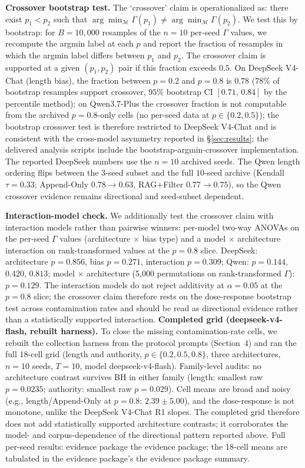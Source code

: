\documentclass[11pt]{article}
\begin{document}
\noindent\textbf{Crossover bootstrap test.} The `crossover' claim is operationalized as: there exist $p_1 < p_2$ such that $\arg\min_{\mathcal{M}} \Gamma(p_1) \neq \arg\min_{\mathcal{M}} \Gamma(p_2)$. We test this by bootstrap: for $B = 10{,}000$ resamples of the $n=10$ per-seed $\Gamma$ values, we recompute the argmin label at each $p$ and report the fraction of resamples in which the argmin label differs between $p_1$ and $p_2$. The crossover claim is supported at a given $(p_1, p_2)$ pair if this fraction exceeds $0.5$. On DeepSeek V4-Chat (length bias), the fraction between $p=0.2$ and $p=0.8$ is $0.78$ ($78\%$ of bootstrap resamples support crossover, $95\%$ bootstrap CI $[0.71,\,0.84]$ by the percentile method); on Qwen3.7-Plus the crossover fraction is not computable from the archived $p{=}0.8$-only cells (no per-seed data at $p \in \{0.2, 0.5\}$); the bootstrap crossover test is therefore restricted to DeepSeek V4-Chat and is consistent with the cross-model asymmetry reported in \S\ref{sec:results}; the delivered analysis scripts include the bootstrap-argmin-crossover implementation. The reported DeepSeek numbers use the $n{=}10$ archived seeds. The Qwen length ordering flips between the $3$-seed subset and the full $10$-seed archive (Kendall $\tau = 0.33$; Append-Only $0.78 \to 0.63$, RAG+Filter $0.77 \to 0.75$), so the Qwen crossover evidence remains directional and seed-subset dependent.

\noindent\textbf{Interaction-model check.} We additionally test the crossover claim with interaction models rather than pairwise winners: per-model two-way ANOVAs on the per-seed $\Gamma$ values (architecture $\times$ bias type) and a model $\times$ architecture interaction on rank-transformed values at the $p{=}0.8$ slice. DeepSeek: architecture $p = 0.856$, bias $p = 0.271$, interaction $p = 0.309$; Qwen: $p = 0.144$, $0.420$, $0.813$; model $\times$ architecture (5{,}000 permutations on rank-transformed $\Gamma$): $p = 0.129$. The interaction models do not reject additivity at $\alpha = 0.05$ at the $p{=}0.8$ slice; the crossover claim therefore rests on the dose-response bootstrap test across contamination rates and should be read as directional evidence rather than a statistically supported interaction.
\noindent\textbf{Completed grid (deepseek-v4-flash, rebuilt harness).} To close the missing contamination-rate cells, we rebuilt the collection harness from the protocol prompts (Section~4) and ran the full 18-cell grid (length and authority, $p \in \{0.2, 0.5, 0.8\}$, three architectures, $n{=}10$ seeds, $T{=}10$, model deepseek-v4-flash). Family-level audits: no architecture contrast survives BH in either family (length: smallest raw $p{=}0.0235$; authority: smallest raw $p{=}0.029$). Cell means are broad and noisy (e.g., length/Append-Only at $p{=}0.8$: $2.39 \pm 5.00$), and the dose-response is not monotone, unlike the DeepSeek V4-Chat R1 slopes. The completed grid therefore does not add statistically supported architecture contrasts; it corroborates the model- and corpus-dependence of the directional pattern reported above. Full per-seed results: evidence package the evidence package; the 18-cell means are tabulated in the evidence package's the evidence package summary.
\end{document}
